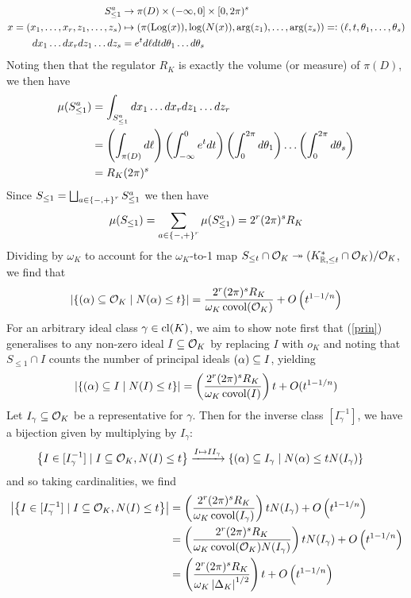 \documentclass[11pt]{report}
\begin{document}
\begin{align*}
    S_{\leq 1}^a &\to \pi(D) \times (-\infty, 0] \times [0, 2\pi)^s \\
    x = (x_1, \ldots, x_r, z_1, \ldots, z_s) &\mapsto (\pi(\operatorname{Log}(x)), \log(N(x)), \arg(z_1), \ldots, \arg(z_s)) =\vcentcolon (\ell, t, \theta_1, \ldots, \theta_s) \\
    dx_1 \ldots dx_r dz_1 \ldots dz_s &= e^t d\ell dt d\theta_1 \ldots d\theta_s
\end{align*}
Noting then that the regulator $R_K$ is exactly the volume (or measure) of $\pi(D)$, we then have
\begin{align*}
    \mu(S_{\leq 1}^a) &= \int_{S_{\leq 1}^a} dx_1 \ldots dx_r dz_1 \ldots dz_r \\
    &= \left(  \int_{\pi(D)} d\ell  \right)\left(  \int_{-\infty}^0 e^t dt  \right)\left(  \int_0^{2\pi} d\theta_1  \right) \ldots \left(  \int_0^{2\pi} d\theta_s  \right) \\
    &= R_K(2\pi)^s
\end{align*}
Since $S_{\leq 1} = \bigsqcup_{a \in \left\{  -, +  \right\}^r} S_{\leq 1}^a$ we then have
$$
    \mu(S_{\leq 1}) = \sum_{a \in \left\{  -, +  \right\}^r}\mu(S_{\leq 1}^a) = 2^r(2\pi)^sR_K
$$
Dividing by $\omega_K$ to account for the $\omega_K$-to-1 map $S_{\leq t} \cap \mathcal{O}_K \twoheadrightarrow (K_{\mathbb{R}, \leq t}^* \cap \mathcal{O}_K) / \mathcal{O}_K$, we find that
\begin{align}\label{prin}
    \left| \left\{  (\alpha) \subseteq \mathcal{O}_K \mid N(\alpha) \leq t  \right\} \right| = \frac{2^r(2\pi)^sR_K}{\omega_K\operatorname{covol}(\mathcal{O}_K)} + O\left(  t^{1 - 1/n}  \right)
\end{align}
For an arbitrary ideal class $\gamma \in \operatorname{cl}(K)$, we aim to show  note first that (\ref{prin}) generalises to any non-zero ideal $I \subseteq \mathcal{O}_K$ by replacing $I$ with $o_K$ and noting that $S_{\leq 1} \cap I$ counts the number of principal ideals $(\alpha) \subseteq I$, yielding
\begin{align}
    \left| \left\{  (\alpha) \subseteq I \mid N(I) \leq t  \right\} \right| = \left(  \frac{2^r(2\pi)^sR_K}{\omega_K\operatorname{covol}(I)}  \right)t + O(t^{1 - 1/n})
\end{align}
Let $I_\gamma \subseteq \mathcal{O}_K$ be a representative for $\gamma$. Then for the inverse class $[I_\gamma^{-1}]$, we have a bijection given by multiplying by $I_\gamma$:
\begin{align*}
    \left\{  I \in [I_{\gamma}^{-1}] \mid I \subseteq \mathcal{O}_K, N(I) \leq t  \right\} &\xrightarrow{I \mapsto II_\gamma} \left\{  (\alpha) \subseteq I_\gamma \mid N(\alpha) \leq tN(I_\gamma)  \right\}
\end{align*}
and so taking cardinalities, we find
\begin{align*}
    \left| \left\{  I \in [I_{\gamma}^{-1}] \mid I \subseteq \mathcal{O}_K, N(I) \leq t  \right\} \right| &= \left(  \frac{2^r(2\pi)^s R_K}{\omega_K \operatorname{covol}(I_\gamma)}  \right)tN(I_\gamma) + O\left(  t^{1 - 1/n}  \right) \\
    &= \left(  \frac{2^r(2\pi)^s R_K}{\omega_K \operatorname{covol}(\mathcal{O}_K)N(I_\gamma)}  \right)tN(I_\gamma) + O\left(  t^{1 - 1/n}  \right) \\
    &= \left(  \frac{2^r(2\pi)^s R_K}{\omega_K \left| \Delta_K \right|^{1/2}}  \right)t + O\left(  t^{1 - 1/n}  \right)
\end{align*}
\end{document}
